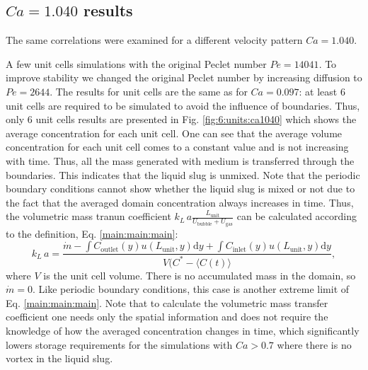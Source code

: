 \documentclass{article}
\newcommand{\beq}{\begin{equation}}
\newcommand{\feq}{\end{equation}}
\newcommand{\vol}{k_L\,a}
\newcommand{\lunit}{L_{\mathrm{unit}}}
\newcommand{\ububble}{U_{\mathrm{bubble}}}
\newcommand{\ugas}{U_{\mathrm{gas}}}
\newcommand{\cinlet}{C_{\mathrm{inlet}}}
\newcommand{\coutlet}{C_{\mathrm{outlet}}}
\newcommand{\cstar}{C^{*}}
\newcommand{\volnondim}{\vol \frac{\lunit}{\ububble+\ugas}}
\begin{document}
\subsection{$Ca=1.040$ results}
The same correlations were examined for a different velocity pattern $Ca=1.040$.%

A few unit cells simulations with the original Peclet number $Pe=14041$.
To improve stability we changed the original Peclet number by increasing
diffusion to $Pe=2644$. The results for unit cells are the same as for $Ca=0.097$:
at least $6$ unit cells are required to be simulated to avoid the influence of boundaries. Thus,
only $6$ unit cells results are presented in Fig. \ref{fig:6:units:ca1040} which shows the
average concentration for each unit cell. One can see that the average volume concentration for each unit cell comes to
a constant value and is not increasing with time. Thus, all the
mass generated with medium is transferred through the boundaries. This indicates that the
liquid slug is unmixed. Note that the periodic boundary conditions cannot show whether the
liquid slug is mixed or not due to the fact that the averaged domain concentration always increases in time. 
Thus, the volumetric mass tranun coefficient $\volnondim$ can be calculated according to the
definition, Eq. \ref{main:main:main}:
\beq
\label{inlet:outlet:spatial:location}
\vol =
\frac{\dot{m}-\int{\coutlet(y)u(\lunit,y)\mathrm{d}y}+\int{\cinlet(y)u(\lunit,y)\mathrm{d}y}}{V
(\cstar - \langle C(t) \rangle},
\feq 
where $V$ is the unit cell volume. There is no accumulated mass in the domain, so $\dot{m}=0$. Like periodic boundary
conditions, this case is another extreme limit of Eq. \ref{main:main:main}. Note that to calculate
the volumetric mass transfer coefficient one needs only the spatial information and does not
require the knowledge of how the averaged concentration changes in time, which significantly
lowers storage requirements for the simulations with $Ca>0.7$ where there is no vortex in the
liquid slug. 
\end{document}
